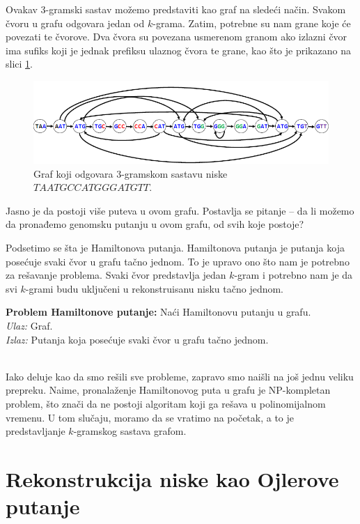 Ovakav 3-gramski sastav mo\v zemo predstaviti kao graf na slede\'ci na\v cin. Svakom \v cvoru u grafu odgovara jedan od $k$-grama. Zatim, potrebne su nam grane koje će povezati te čvorove. Dva čvora su povezana usmerenom granom ako izlazni čvor ima sufiks koji je jednak prefiksu ulaznog čvora te grane, kao što je prikazano na slici \ref{slika:hamilton}.

\begin{figure}[H]
	\centering
	\includegraphics[width=1\textwidth]{poglavlja/3/slike/hamilton.png}
	\caption{Graf koji odgovara 3-gramskom sastavu niske $TAATGCCATGGGATGTT$.}
	\label{slika:hamilton}
\end{figure} 

Jasno je da postoji više puteva u ovom grafu. Postavlja se pitanje -- da li možemo da pronađemo genomsku putanju u ovom grafu, od svih koje postoje?

Podsetimo se šta je Hamiltonova putanja. Hamiltonova putanja je putanja koja posećuje svaki čvor u grafu tačno jednom. To je upravo ono što nam je potrebno za rešavanje problema. Svaki čvor predstavlja jedan $k$-gram i potrebno nam je da svi $k$-grami budu uključeni u rekonstruisanu nisku tačno jednom.
~ \\
\begin{tcolorbox}
	\textbf{Problem Hamiltonove putanje:} Naći Hamiltonovu putanju u grafu. \\
	\textit{Ulaz:} Graf.\\
	\textit{Izlaz:} Putanja koja posećuje svaki čvor u grafu tačno jednom.
\end{tcolorbox}

~\\

Iako deluje kao da smo rešili sve probleme, zapravo smo naišli na još jednu veliku prepreku. Naime, pronalaženje Hamiltonovog puta u grafu je NP-kompletan problem, što znači da ne postoji algoritam koji ga rešava u polinomijalnom vremenu. U tom slučaju, moramo da se vratimo na početak, a to je predstavljanje $k$-gramskog sastava grafom.

\section{Rekonstrukcija niske kao Ojlerove putanje}

